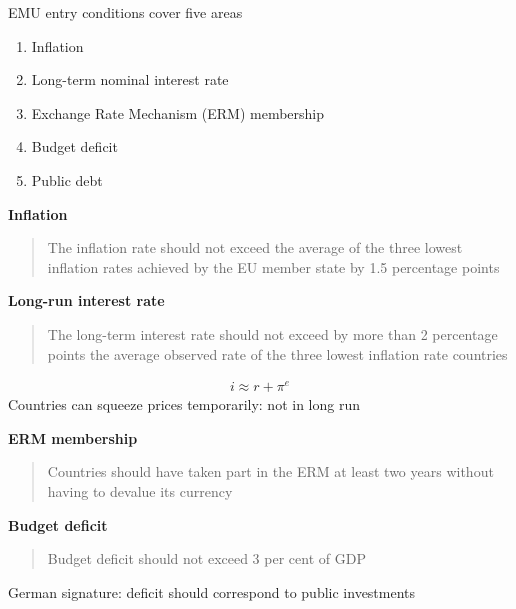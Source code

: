 \documentclass{beamer}
\begin{document}
\begin{frame}
 EMU entry conditions cover five areas
\begin{enumerate}
  \item Inflation
  \item Long-term nominal interest rate
  \item Exchange Rate Mechanism (ERM) membership
  \item Budget deficit
  \item Public debt
\end{enumerate}
\end{frame}

\begin{frame}
  \textbf{Inflation}
  \begin{quote}
    The inflation rate should not exceed the average of the three lowest inflation rates achieved by the EU member state by 1.5 percentage points 
  \end{quote}
    \textbf{Long-run interest rate}
    \begin{quote}
      The long-term interest rate should not exceed by more than 2 percentage points the average observed rate of the three lowest inflation rate countries
    \end{quote}
  \begin{align}
    i \approx r + \pi^e
  \end{align}
  \medskip
  Countries can squeeze prices temporarily: not in long run  
\end{frame}

\begin{frame} 
  \textbf{ERM membership}
  \begin{quote}
    Countries should have taken part in the ERM at least two years without having to devalue its currency 
  \end{quote}  
  \textbf{Budget deficit}
  \begin{quote}
    Budget deficit should not exceed 3 per cent of GDP
  \end{quote}
   \medskip
   German signature: deficit should correspond to public investments           
\end{frame}
\end{document}

